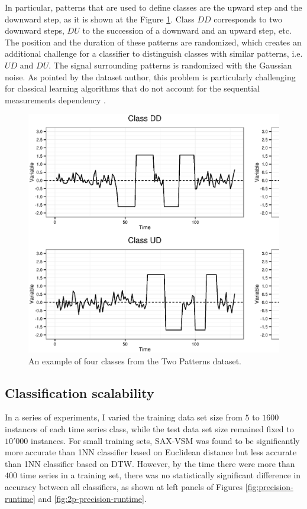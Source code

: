In particular, patterns that are used to define classes are the upward step and the downward step,
as it is shown at the Figure \ref{fig:2patterns}. Class $DD$ corresponds to two downward steps, $DU$ to the succession
of a downward and an upward step, etc. The position and the duration of these patterns are randomized, 
which creates an additional challenge for a classifier to distinguish classes with similar patterns, i.e. $UD$ and $DU$.
The signal surrounding patterns is randomized with the Gaussian noise. 
As pointed by the dataset author, this problem is particularly challenging for classical learning 
algorithms that do not account for the sequential measurements dependency \cite{two_patterns}.

\begin{figure}[t]
   \centering
   \includegraphics[width=140mm]{figures/2patterns.ps}
   \caption{An example of four classes from the Two Patterns dataset.}
   \label{fig:2patterns}
\end{figure}

\subsection{Classification scalability}
In a series of experiments, I varied the training data set size from $5$ to $1600$ instances of each time series class, 
while the test data set size remained fixed to $10'000$ instances. 
For small training sets, SAX-VSM was found to be significantly more accurate than 1NN classifier based on Euclidean 
distance but less accurate than 1NN classifier based on DTW. 
However, by the time there were more than $400$ time series in a training set, there was no statistically 
significant difference in accuracy between all classifiers, 
as shown at left panels of Figures \ref{fig:precision-runtime} and \ref{fig:2p-precision-runtime}. 


